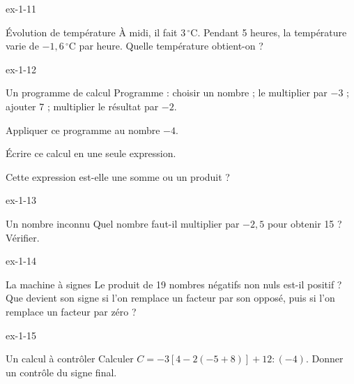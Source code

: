 \begin{blocLivre}{ex-1-11}\begin{exercice}[3]{Évolution de température}
À midi, il fait $3\,^\circ$C. Pendant 5 heures, la température varie de $-1{,}6\,^\circ$C par heure. Quelle température obtient-on ?
\end{exercice}\end{blocLivre}
\begin{blocLivre}{ex-1-12}\begin{exercice}[3]{Un programme de calcul}
Programme : choisir un nombre ; le multiplier par $-3$ ; ajouter 7 ; multiplier le résultat par $-2$.\begin{questions}
\item Appliquer ce programme au nombre $-4$.
\item Écrire ce calcul en une seule expression.
\item Cette expression est-elle une somme ou un produit ?
\end{questions}
\end{exercice}\end{blocLivre}
\begin{blocLivre}{ex-1-13}\begin{exercice}[3]{Un nombre inconnu}
Quel nombre faut-il multiplier par $-2{,}5$ pour obtenir 15 ? Vérifier.
\end{exercice}\end{blocLivre}
\begin{blocLivre}{ex-1-14}\begin{exercice}[3]{La machine à signes}
Le produit de 19 nombres négatifs non nuls est-il positif ? Que devient son signe si l’on remplace un facteur par son opposé, puis si l’on remplace un facteur par zéro ?
\end{exercice}\end{blocLivre}
\begin{blocLivre}{ex-1-15}\begin{exercice}[3]{Un calcul à contrôler}
Calculer $C=-3[4-2(-5+8)]+12:(-4)$. Donner un contrôle du signe final.
\end{exercice}\end{blocLivre}

\clearpage
